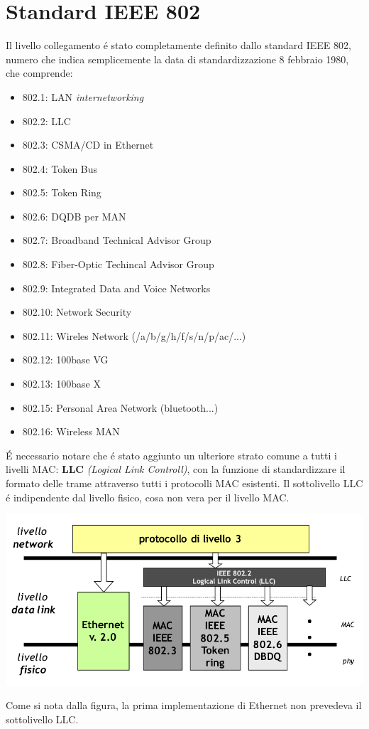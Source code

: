 \documentclass[12pt]{article}
\begin{document}
\section{Standard IEEE 802}\label{ieee-802}
Il livello collegamento \'e stato completamente definito dallo standard IEEE 802, numero che indica semplicemente la data di 
standardizzazione 8 febbraio 1980, che comprende:
\begin{itemize}[noitemsep]
	\item 802.1: LAN \textit{internetworking}
	\item 802.2: LLC
	\item 802.3: CSMA/CD in Ethernet
	\item 802.4: Token Bus
	\item 802.5: Token Ring 
	\item 802.6: DQDB per MAN
	\item 802.7: Broadband Technical Advisor Group
	\item 802.8: Fiber-Optic Techincal Advisor Group
	\item 802.9: Integrated Data and Voice Networks
	\item 802.10: Network Security
	\item 802.11: Wireles Network (/a/b/g/h/f/s/n/p/ac/...)
	\item 802.12: 100base VG
	\item 802.13: 100base X
	\item 802.15: Personal Area Network (bluetooth...)
	\item 802.16: Wireless MAN
\end{itemize}
\'E necessario notare che \'e stato aggiunto un ulteriore strato comune a tutti i livelli MAC: \textbf{LLC} \textit{(Logical 
Link Controll)}, con la funzione di standardizzare il formato delle trame attraverso tutti i protocolli MAC esistenti. Il 
sottolivello LLC \'e indipendente dal livello fisico, cosa non vera per il livello MAC.
\begin{center}
	\includegraphics[scale=0.4]{livello_collegamento-img16.png}
\end{center}
Come si nota dalla figura, la prima implementazione di Ethernet non prevedeva il sottolivello LLC.
\end{document}
